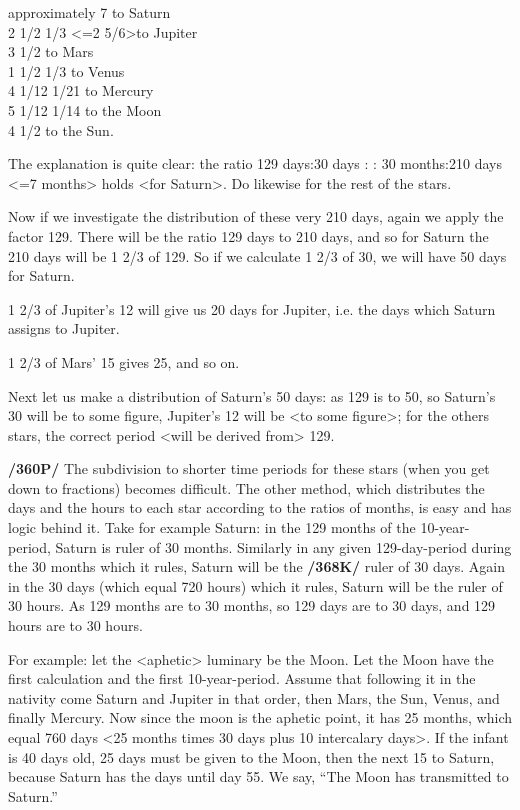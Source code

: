 \noindent approximately 7 to Saturn \\
2 1/2 1/3 <=2 5/6>to Jupiter \\
3 1/2 to Mars \\
1 1/2 1/3 to Venus \\
4 1/12 1/21 to Mercury \\
5 1/12 1/14 to the Moon \\
4 1/2 to the Sun. 

The explanation is quite clear: 
the ratio 129 days:30 days : : 30 months:210 days <=7 months>
holds <for Saturn>. Do likewise for the rest of the stars.

Now if we investigate the distribution of these very 210 days, again we apply the factor 129. There will be the ratio 129 days to 210 days, and so for Saturn the 210 days will be 1 2/3 of 129. So if we
calculate 1 2/3 of 30, we will have 50 days for Saturn. 

1 2/3 of Jupiter’s 12 will give us 20 days for Jupiter, i.e. the days which Saturn assigns to Jupiter. 

1 2/3 of Mars’ 15 gives 25, and so on.

Next let us make a distribution of Saturn’s 50 days: as 129 is to 50, so Saturn’s 30 will be to some figure, Jupiter’s 12 will be <to some figure>; for the others stars, the correct period <will be derived from> 129.

\textbf{/360P/} The subdivision to shorter time periods for these stars (when you get down to fractions) becomes difficult. The other method, which distributes the days and the hours to each star according to the ratios of months, is easy and has logic behind it. Take for example Saturn: in the 129 months of the 10-year-period, Saturn is ruler of 30 months. Similarly in any given 129-day-period during the 30 months which it rules, Saturn will be the \textbf{/368K/} ruler of 30 days. Again in the 30 days (which equal 720 hours) which it rules, Saturn will be the ruler of 30 hours. As 129 months are to 30 months, so 129 days are to 30 days, and 129 hours are to 30 hours. 

For example: let the <aphetic> luminary be the Moon. Let the Moon have the first calculation and the first 10-year-period. Assume that following it in the nativity come Saturn and Jupiter in that order, then
Mars, the Sun, Venus, and finally Mercury. Now since the moon is the aphetic point, it has 25 months, which equal 760 days <25 months times 30 days plus 10 intercalary days>. If the infant is 40 days old, 25 days must be given to the Moon, then the next 15 to Saturn, because Saturn has the days until day 55. We say, “The Moon has transmitted to Saturn.” 

